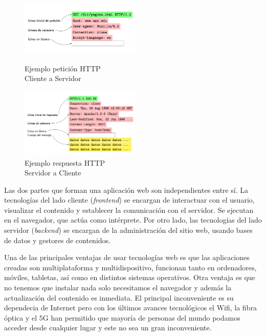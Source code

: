 \begin{figure}[H]
\centering
\begin{minipage}[t]{.45\linewidth}
\centering
\includegraphics[width=2.25in]{chapters/images/peticionhttp.png}
\caption{Ejemplo petición HTTP\\ Cliente a Servidor}
\end{minipage}
\hspace{0.25in}
\begin{minipage}[t]{.45\linewidth}
\centering
\includegraphics[width=2.25in]{chapters/images/respuestahttp.png}
\caption{Ejemplo respuesta HTTP\\ Servidor a Cliente}
\end{minipage}
\end{figure}


Las dos partes que forman una aplicación web son independientes entre sí. La tecnologías del  lado cliente (\textit{frontend}) se encargan de  interactuar con el usuario, visualizar el contenido y establecer la comunicación con el servidor. Se ejecutan en el navegador, que actúa como intérprete. Por otro lado, las tecnologías del lado servidor (\textit{backend}) se encargan de la administración del sitio web, usando bases de datos y gestores de contenidos.

Una de las principales ventajas de usar tecnologías web es que las aplicaciones creadas son multiplataforma y multidispositivo, funcionan tanto en ordenadores, móviles, tabletas, así como en distintos sistemas operativos. Otra ventaja es que no tenemos que instalar nada solo necesitamos el navegador y además la actualización del contenido es inmediata. El principal inconveniente es su dependecia de Internet pero con los últimos avances tecnológicos el Wifi, la fibra óptica y el 5G han permitido que  mayoría de personas del mundo podamos acceder desde cualquier lugar y este no sea un gran inconveniente.


